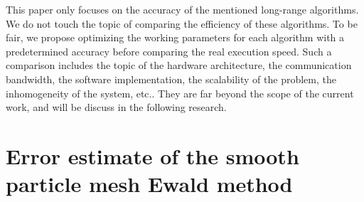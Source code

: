 \documentclass[journal=jacsat,manuscript=article]{achemso}
\begin{document}
This paper only focuses on the accuracy of the
mentioned long-range algorithms.
We do not touch the topic of comparing the efficiency of these algorithms.
To be fair,
we propose 
optimizing the working parameters for each algorithm with a
predetermined accuracy before
comparing
the real execution speed.
Such a comparison includes the topic of the hardware architecture,
the communication bandwidth,
the software implementation, the scalability of the problem,
the inhomogeneity of the system, etc..
They are far beyond the scope of the current
work, and will be discuss in the following research.




\appendix
\section{Error estimate of the smooth particle mesh
Ewald method}
\label{sec:appendix}
\end{document}

